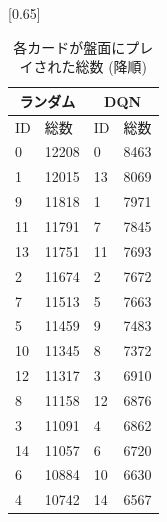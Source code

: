 \documentclass[twocolumn]{jarticle}
\begin{document}
  \begin{table}[t]
    \centering
    \caption{各カードが盤面にプレイされた総数 (降順)}
    \vspace{-0.3cm}
    \label{table:cardcount}
    \scalebox{0.75}[0.65]{
      \begin{tabular}{|ll|ll|}
        \hline
        \multicolumn{2}{|c|}{ランダム}       & \multicolumn{2}{c|}{DQN}       \\ \hline
        \multicolumn{1}{|l|}{ID} & 総数    & \multicolumn{1}{l|}{ID} & 総数   \\ \hline \hline
        \multicolumn{1}{|l|}{0}  & 12208 & \multicolumn{1}{l|}{0}  & 8463 \\ \hline
        \multicolumn{1}{|l|}{1}  & 12015 & \multicolumn{1}{l|}{13} & 8069 \\ \hline
        \multicolumn{1}{|l|}{9}  & 11818 & \multicolumn{1}{l|}{1}  & 7971 \\ \hline
        \multicolumn{1}{|l|}{11} & 11791 & \multicolumn{1}{l|}{7}  & 7845 \\ \hline
        \multicolumn{1}{|l|}{13} & 11751 & \multicolumn{1}{l|}{11} & 7693 \\ \hline
        \multicolumn{1}{|l|}{2}  & 11674 & \multicolumn{1}{l|}{2}  & 7672 \\ \hline
        \multicolumn{1}{|l|}{7}  & 11513 & \multicolumn{1}{l|}{5}  & 7663 \\ \hline
        \multicolumn{1}{|l|}{5}  & 11459 & \multicolumn{1}{l|}{9}  & 7483 \\ \hline
        \multicolumn{1}{|l|}{10} & 11345 & \multicolumn{1}{l|}{8}  & 7372 \\ \hline
        \multicolumn{1}{|l|}{12} & 11317 & \multicolumn{1}{l|}{3}  & 6910 \\ \hline
        \multicolumn{1}{|l|}{8}  & 11158 & \multicolumn{1}{l|}{12} & 6876 \\ \hline
        \multicolumn{1}{|l|}{3}  & 11091 & \multicolumn{1}{l|}{4}  & 6862 \\ \hline
        \multicolumn{1}{|l|}{14} & 11057 & \multicolumn{1}{l|}{6}  & 6720 \\ \hline
        \multicolumn{1}{|l|}{6}  & 10884 & \multicolumn{1}{l|}{10} & 6630 \\ \hline
        \multicolumn{1}{|l|}{4}  & 10742 & \multicolumn{1}{l|}{14} & 6567 \\ \hline
        \end{tabular}
    }
    \end{table}
\end{document}
